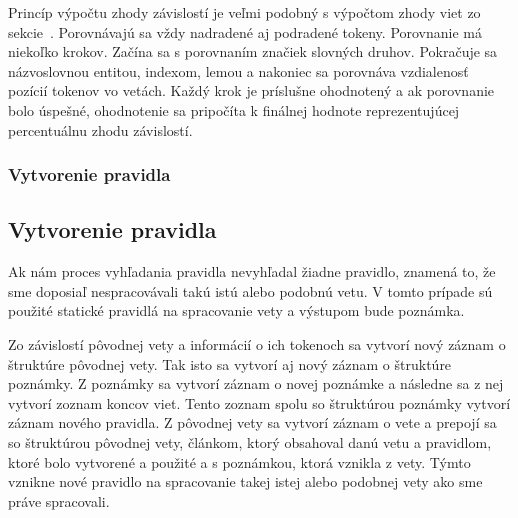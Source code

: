 Princíp výpočtu zhody závislostí je veľmi podobný s výpočtom zhody viet zo sekcie~. Porovnávajú sa vždy nadradené aj podradené tokeny. Porovnanie má niekoľko krokov. Začína sa s porovnaním značiek slovných druhov. Pokračuje sa názvoslovnou entitou, indexom, lemou a nakoniec sa porovnáva vzdialenosť pozícií tokenov vo vetách. Každý krok je príslušne ohodnotený a ak porovnanie bolo úspešné, ohodnotenie sa pripočíta k finálnej hodnote reprezentujúcej percentuálnu zhodu závislostí.

%
%
{
	\subsubsection{Vytvorenie pravidla}
}
{
	\subsection{Vytvorenie pravidla}
}
\label{subsubsection:rule_creation}
Ak nám proces vyhľadania pravidla nevyhľadal žiadne pravidlo, znamená to, že sme doposiaľ nespracovávali takú istú alebo podobnú vetu. V tomto prípade sú použité statické pravidlá na spracovanie vety a výstupom bude poznámka.

Zo závislostí pôvodnej vety a informácií o ich tokenoch sa vytvorí nový záznam o štruktúre pôvodnej vety. Tak isto sa vytvorí aj nový záznam o štruktúre poznámky. Z poznámky sa vytvorí záznam o novej poznámke a následne sa z nej vytvorí zoznam koncov viet. Tento zoznam spolu so štruktúrou poznámky vytvorí záznam nového pravidla. Z pôvodnej vety sa vytvorí záznam o vete a prepojí sa so štruktúrou pôvodnej vety, článkom, ktorý obsahoval danú vetu a pravidlom, ktoré bolo vytvorené a použité a s poznámkou, ktorá vznikla z vety. Týmto vznikne nové pravidlo na spracovanie takej istej alebo podobnej vety ako sme práve spracovali.



